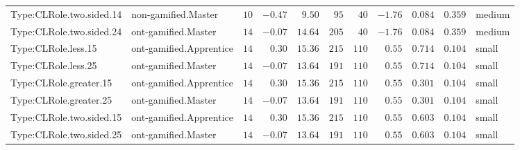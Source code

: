 \documentclass[6pt,a4paper]{article}
\begin{document}
{\begin{longtable}{llrrrrrrrrl}
Type:CLRole.two.sided.14&non-gamified.Master&$10$&$-0.47$&$ 9.50$&$ 95$&$ 40$&$-1.76$&$0.084$&$0.359$&medium\tabularnewline
Type:CLRole.two.sided.24&ont-gamified.Master&$14$&$-0.07$&$14.64$&$205$&$ 40$&$-1.76$&$0.084$&$0.359$&medium\tabularnewline
Type:CLRole.less.15&ont-gamified.Apprentice&$14$&$ 0.30$&$15.36$&$215$&$110$&$ 0.55$&$0.714$&$0.104$&small\tabularnewline
Type:CLRole.less.25&ont-gamified.Master&$14$&$-0.07$&$13.64$&$191$&$110$&$ 0.55$&$0.714$&$0.104$&small\tabularnewline
Type:CLRole.greater.15&ont-gamified.Apprentice&$14$&$ 0.30$&$15.36$&$215$&$110$&$ 0.55$&$0.301$&$0.104$&small\tabularnewline
Type:CLRole.greater.25&ont-gamified.Master&$14$&$-0.07$&$13.64$&$191$&$110$&$ 0.55$&$0.301$&$0.104$&small\tabularnewline
\newpage
Type:CLRole.two.sided.15&ont-gamified.Apprentice&$14$&$ 0.30$&$15.36$&$215$&$110$&$ 0.55$&$0.603$&$0.104$&small\tabularnewline
Type:CLRole.two.sided.25&ont-gamified.Master&$14$&$-0.07$&$13.64$&$191$&$110$&$ 0.55$&$0.603$&$0.104$&small\tabularnewline
\hline
\end{longtable}}
\end{document}
